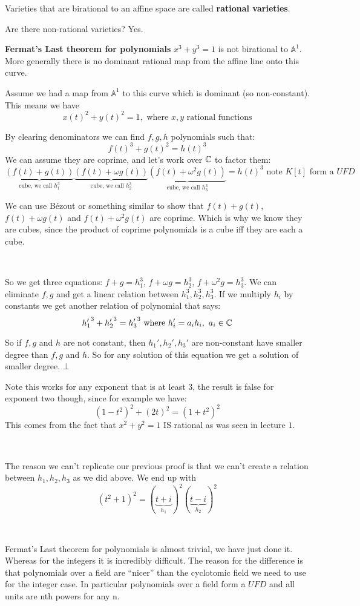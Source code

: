 \begin{definition}
    Varieties that are birational to an affine space are called \textbf{rational varieties}.
\end{definition}
Are there non-rational varieties? Yes.
\begin{example}\textbf{Fermat's Last theorem for polynomials}
    $x^3+y^3 = 1$ is not birational to $\mathbb{A}^1$. More generally there is no dominant rational map from the affine line onto this curve. 

    Assume we had a map from $\mathbb{A}^1$ to this curve which is dominant (so non-constant). This means we have \[{x(t)}^2+{y(t)}^2 = 1, \text{ where }x,y \text{ rational functions}\]

    By clearing denominators we can find $f,g,h$ polynomials such that: \[{f(t)}^3 + {g(t)}^2 = {h(t)}^3 \]
We can assume they are coprime, and let's work over $\mathbb{C}$ to factor them:
\[
    \underbrace{(f(t)+g(t))}_{\text{cube, we call }h_1^3}\underbrace{(f(t)+\omega g(t))}_{\text{cube, we call }h_2^3}\underbrace{(f(t)+\omega^2 g(t))}_{\text{cube, we call }h_3^3} = {h(t)}^3 \text{ note }K[t]\text{ form a }UFD    
\]

\begin{remark}
    We can use Bézout or something similar to show that $f(t)+g(t)$, $f(t)+\omega g(t)$ and $f(t)+\omega^2 g(t)$ are coprime. Which is why we know they are cubes, since the product of coprime polynomials is a cube iff they are each a cube.


\end{remark}


\

So we get three equations: $f+g = h_1^3$, $f+\omega g = h_2^3$, $f+\omega^2 g = h_3^3$. We can eliminate $f,g$ and get a linear relation between $h_1^3,h_2^3,h_3^3$. If we multiply $h_i$ by constants we get another relation of polynomial that says:\[{h_1'}^3+{h_2'}^3={h_3'}^3 \text{ where }h_i' ={a_i}{h_i}, \text{ }a_i\in \mathbb{C} \]

So if $f,g$ and $h$ are not constant, then $h_1',h_2',h_3'$ are non-constant have smaller degree than $f,g$ and $h$. So for any solution of this equation we get a solution of smaller degree. $\bot$

Note this works for any exponent that is at least $3$, the result is false for exponent two though, since for example we have:\[{(1-t^2)}^2 + {(2t)}^2 = {(1+t^2)}^2 \]
This comes from the fact that $x^2+y^2=1$ IS rational as was seen in lecture $1$.

\

The reason we can't replicate our previous proof is that we can't create a relation between $h_1,h_2,h_3$ as we did above. We end up with \[{(t^2+1)}^2 = {(\underbrace{t+i}_{h_1})}^2{(\underbrace{t-i}_{h_2})}^2\]

\

Fermat's Last theorem for polynomials is almost trivial, we have just done it. Whereas for the integers it is incredibly difficult. The reason for the difference is that polynomials over a field are ``nicer'' than the cyclotomic field we need to use for the integer case. In particular polynomials over a field form a $UFD$ and all units are nth powers for any n. 
\end{example}

